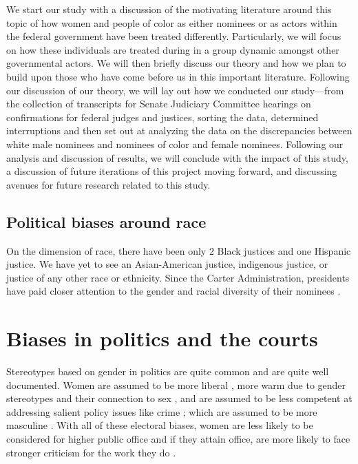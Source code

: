 \documentclass [12pt]{article}
\begin{document}
We start our study with a discussion of the motivating literature around this topic of how women and people of color as either nominees or as actors within the federal government have been treated differently. Particularly, we will focus on how these individuals are treated during in a group dynamic amongst other governmental actors. We will then briefly discuss our theory and how we plan to build upon those who have come before us in this important literature. Following our discussion of our theory, we will lay out how we conducted our study—from the collection of transcripts for Senate Judiciary Committee hearings on confirmations for federal judges and justices, sorting the data, determined interruptions and then set out at analyzing the data on the discrepancies between white male nominees and nominees of color and female nominees. Following our analysis and discussion of results, we will conclude with the impact of this study, a discussion of future iterations of this project moving forward, and discussing avenues for future research related to this study. 

	\subsection{Political biases around race}
On the dimension of race, there have been only 2 Black justices and one Hispanic justice. We have yet to see an Asian-American justice, indigenous justice, or justice of any other race or ethnicity. Since the Carter Administration, presidents have paid closer attention to the gender and racial diversity of their nominees \citep{kastellec_2013}. 

\section{Biases in politics and the courts}

Stereotypes based on gender in politics are quite common and are quite well documented. Women are assumed to be more liberal \citep{mcdermott_1997_ajps}, more warm due to gender stereotypes and their connection to sex \citep{laustsen_bor_2017}, and are assumed to be less competent at addressing salient policy issues like crime \citep{huddy_terkildsen_1993, sanbonmatsu_dolan_2009}; which are assumed to be more masculine \citep{holman_et-al_2016}. With all of these electoral biases, women are less likely to be considered for higher public office \citep{oliver_conroy_2020} and if they attain office, are more likely to face stronger criticism for the work they do \citep{lazarus_steigerwalt_2018}.
\end{document}
